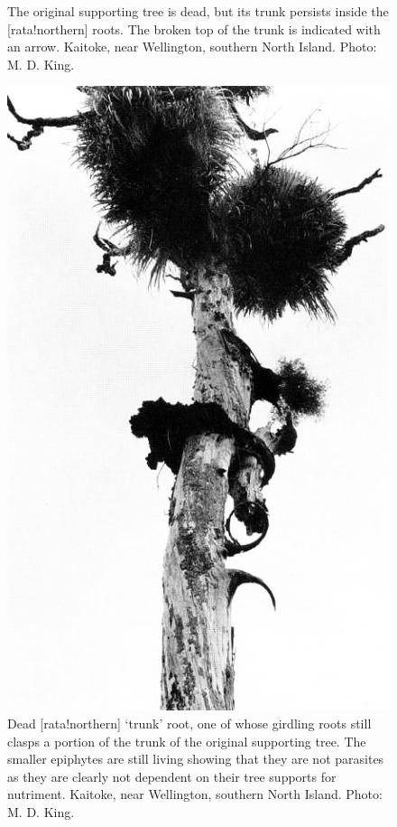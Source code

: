 \begin{figure}[t]
\begin{minipage}[t]{\textwidth}
\begin{minipage}[t]{(\textwidth-\fgap) * \real{0.536}}
{			The original supporting tree is dead, but its trunk persists inside the [rata!northern] roots.
			The broken top of the trunk is indicated with an arrow.
			Kaitoke, near Wellington, southern North Island.
			Photo: M. D. King.}%
			\label{fig:52rata-branched}
		\end{minipage}\hspace{\fgap}%
		\begin{minipage}[t]{(\textwidth-\fgap) * \real{0.464}}
			\centering
			\includegraphics[width=\textwidth]{graphics/figure53dead-rata.jpg}
			\caption[Dead northern rata `trunk' root]{Dead [rata!northern] `trunk' root, one of whose girdling roots still clasps a portion of the trunk of the original supporting tree.
			The smaller epiphytes are still living showing that they are not parasites as they are clearly not dependent on their tree supports for nutriment.
			Kaitoke, near Wellington, southern North Island.
			Photo: M. D. King.}%
			\label{fig:53dead-rata}
		\end{minipage}
	\end{minipage}
\end{figure}

